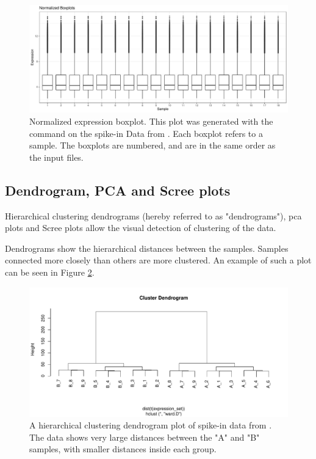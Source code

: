 \begin{figure}
    \centering
    \includegraphics{resources/images/Normalized Boxplots.pdf}
    \caption{Normalized expression boxplot. This plot was generated with the  command on the spike-in Data from \textcite{zhuPreferredAnalysisMethods2010}. Each boxplot refers to a sample. The boxplots are numbered, and are in the same order as the input files.}
    \label{fig:ExprBoxplot}
\end{figure}

\subsection{Dendrogram, PCA and Scree plots}
Hierarchical clustering dendrograms (hereby referred to as "dendrograms"), \gls{pca} plots and Scree plots allow the visual detection of clustering of the data.

Dendrograms show the hierarchical distances between the samples. Samples connected more closely than others are more clustered. An example of such a plot can be seen in Figure \ref{fig:ClusterDendro}.

\begin{figure}
    \centering
    \includegraphics{resources/images/4_Dendrogram - original.pdf}
    \caption{A hierarchical clustering dendrogram plot of spike-in data from \textcite{zhuPreferredAnalysisMethods2010}. The data shows very large distances between the "A" and "B" samples, with smaller distances inside each group.}
    \label{fig:ClusterDendro}
\end{figure}

